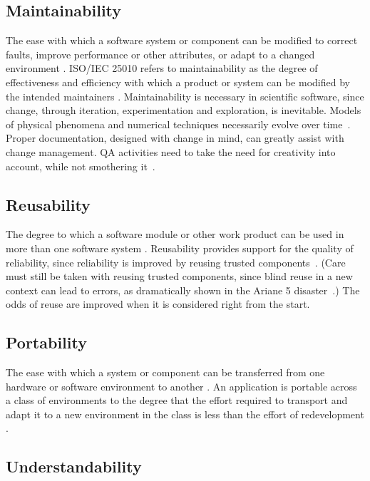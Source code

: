 \documentclass[letterpaper,cleveref]{lipics-v2019}
\begin{document}
\subsection{Maintainability}

The ease with which a software system or component can be modified to correct faults, improve performance or other attributes, or adapt to a changed environment \cite{IEEEStdGlossarySET1990}. ISO/IEC 25010 refers to maintainability as the degree of effectiveness and efficiency with which a product or system can be modified by the intended maintainers \cite{ISO/IEC25010}.
Maintainability is necessary in scientific software, since change, through iteration, experimentation and exploration, is inevitable.  Models of physical phenomena and numerical techniques necessarily evolve over time~\cite{CarverEtAl2007, SegalAndMorris2008}.  Proper documentation, designed with change in mind, can greatly assist with change management.  QA activities need to take the need for creativity into account, while not smothering
it~\cite[p.~352]{Roache1998}.

\subsection{Reusability}

The degree to which a software module or other work product can be used in more than one software system \cite{IEEEStdGlossarySET1990}. Reusability provides support for the quality of reliability, since reliability
is improved by reusing trusted components~\cite{Dubois2005}.  (Care must still
be taken with reusing trusted components, since blind reuse in a new context can lead to errors, as dramatically shown in the Ariane 5 disaster~\cite[p.~37--38]{OliveiraAndStewart2006}.)  The odds of reuse are improved when it is considered right from the start.

\subsection{Portability}

The ease with which a system or component can be transferred from one hardware or software environment to another \cite{IEEEStdGlossarySET1990}. An application is portable across a class of environments to the degree that the effort required to transport and adapt it to a new environment in the class is less than the effort of redevelopment \cite{mooney1990strategies}.
 

\subsection{Understandability}
\end{document}
